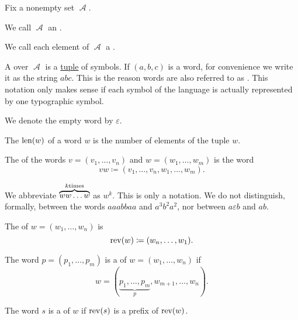 \begin{definition}\label{def:language}
  Fix a nonempty set \( \mscrA \).

  \begin{thmenum}
     We call \( \mscrA \) an .

     We call each element of \( \mscrA \) a .

     A  over \( \mscrA \) is a \hyperref[def:tuple_and_cartesian_product]{tuple} of symbols. If \( (a, b, c) \) is a word, for convenience we write it as the string \( abc \). This is the reason words are also referred to as . This notation only makes sense if each symbol of the language is actually represented by one typographic symbol.

     We denote the empty word by \( \varepsilon \).

     The  \( \operatorname{len}(w) \) of a word \( w \) is the number of elements of the tuple \( w \).

     The  of the words \( v = (v_1, \ldots, v_n) \) and \( w = (w_1, \ldots, w_m) \) is the word
    \begin{equation*}
      vw \coloneqq (v_1, \ldots, v_n, w_1, \ldots, w_m).
    \end{equation*}

    We abbreviate \( \overbrace{w w \ldots w}^{k \T{times}} \) as \( w^k \). This is only a notation. We do not distinguish, formally, between the words \( aaabbaa \) and \( a^3 b^2 a^2 \), nor between \( a \varepsilon b \) and \( ab \).

     The  of \( w = (w_1, \ldots, w_n) \) is
    \begin{equation*}
      \operatorname{rev}(w) \coloneqq (w_n, \ldots, w_1).
    \end{equation*}

     The word \( p = (p_1, \ldots, p_m) \) is a  of \( w = (w_1, \ldots, w_n) \) if
    \begin{equation*}
      w = (\underbrace{p_1, \ldots, p_m}_p, w_{m+1}, \ldots, w_n).
    \end{equation*}

     The word \( s \) is a  of \( w \) if \( \operatorname{rev}(s) \) is a prefix of \( \operatorname{rev}(w) \).


\end{thmenum}
\end{definition}

